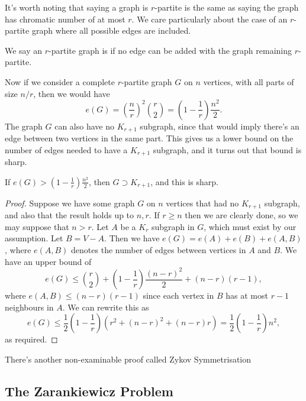 It's worth noting that saying a graph is $r$-partite is the same as saying the graph has chromatic number of at most $r$.
We care particularly about the case of an $r$-partite graph where all possible edges are included.

\begin{definition}
    We say an $r$-partite graph is  if no edge can be added with the graph remaining $r$-partite.
\end{definition}

Now if we consider a complete $r$-partite graph $G$ on $n$ vertices, with all parts of size $n/r$, then we would have 
$$e(G) = \left(\frac{n}{r}\right)^2\binom{r}{2} = \left(1 - \frac{1}{r}\right)\frac{n^2}{2}.$$
The graph $G$ can also have no $K_{r+1}$ subgraph, since 
that would imply there's an edge between two vertices in the same part. This gives us a lower bound on the number of edges needed to have a $K_{r+1}$ subgraph, and it turns out that bound is sharp.

\begin{theorem}
    If $e(G) > \left(1 - \frac{1}{r}\right)\frac{n^2}{2}$, then $G \supset K_{r+1}$, and this is sharp.
\end{theorem}
\begin{proof}
    Suppose we have some graph $G$ on $n$ vertices that had no $K_{r + 1}$ subgraph, and also that the result holds up to $n, r$.
    If $r \geq n$ then we are clearly done, so we may suppose that $n > r$. Let $A$ be a $K_r$ subgraph in $G$, which must exist by our assumption. Let $B = V-A$. Then we have $e(G) = e(A) + e(B) + e(A, B)$, where $e(A, B)$ denotes the number of edges between vertices in $A$ and $B$. We have an upper bound of
    $$
    e(G) \leq \binom{r}{2} + \left(1 - \frac{1}{r}\right)\frac{(n - r)^2}{2} + (n - r)(r - 1),
    $$
    where $e(A, B) \leq (n - r)(r - 1)$ since each vertex in $B$ has at most $r - 1$ neighbours in $A$. We can rewrite this as
    $$
    e(G) \leq \frac{1}{2}\left(1 - \frac{1}{r}\right)(r^2 + (n - r)^2 + (n - r)r) = \frac{1}{2}\left(1 - \frac{1}{r}\right)n^2,
    $$
    as required.
\end{proof}

There's another non-examinable proof called Zykov Symmetrisation


\subsection{The Zarankiewicz Problem}

